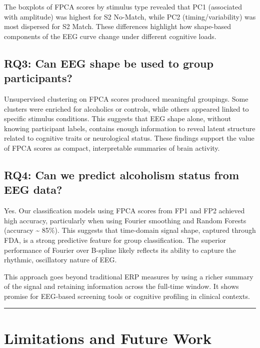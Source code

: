 \documentclass{article}
\begin{document}
The boxplots of FPCA scores by stimulus type revealed that PC1
(associated with amplitude) was highest for S2 No-Match, while PC2
(timing/variability) was most dispersed for S2 Match. These differences
highlight how shape-based components of the EEG curve change under
different cognitive loads.

\subsection{RQ3: Can EEG shape be used to group
participants?}\label{rq3-can-eeg-shape-be-used-to-group-participants}

Unsupervised clustering on FPCA scores produced meaningful groupings.
Some clusters were enriched for alcoholics or controls, while others
appeared linked to specific stimulus conditions. This suggests that EEG
shape alone, without knowing participant labels, contains enough
information to reveal latent structure related to cognitive traits or
neurological status. These findings support the value of FPCA scores as
compact, interpretable summaries of brain activity.

\subsection{RQ4: Can we predict alcoholism status from EEG
data?}\label{rq4-can-we-predict-alcoholism-status-from-eeg-data}

Yes. Our classification models using FPCA scores from FP1 and FP2
achieved high accuracy, particularly when using Fourier smoothing and
Random Forests (accuracy \textasciitilde{} 85\%). This suggests that
time-domain signal shape, captured through FDA, is a strong predictive
feature for group classification. The superior performance of Fourier
over B-spline likely reflects its ability to capture the rhythmic,
oscillatory nature of EEG.

This approach goes beyond traditional ERP measures by using a richer
summary of the signal and retaining information across the full-time
window. It shows promise for EEG-based screening tools or cognitive
profiling in clinical contexts.

\begin{center}\rule{0.5\linewidth}{0.5pt}\end{center}

\section{Limitations and Future Work}\label{limitations-and-future-work}
\end{document}
